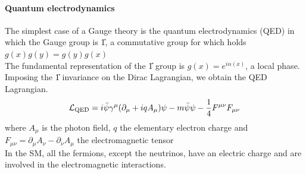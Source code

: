 \paragraph*{Quantum electrodynamics}
The simplest case of a Gauge theory is the quantum electrodynamics (QED) \cite{FeynmanQED:Matter} in which the Gauge group is \U{1}, a commutative group for which holds $g(x)g(y)=g(y)g(x)$\\
The fundamental representation of the \U{1} group is $g(x)=e^{i \alpha(x)}$, \ie a local phase.\\
Imposing the \U{1} invariance on the Dirac Lagrangian, we obtain the QED Lagrangian.
\begin{equation}\label{eq:QED}
    \mathcal{L}_\text{QED}=i\bar{\psi}\gamma^{\mu}(\partial_{\mu}+i q A_{\mu})\psi-m\bar{\psi}\psi-\frac{1}{4}F^{\mu\nu}F_{\mu\nu}
\end{equation}
where $A_\mu$ is the photon field, $q$ the elementary electron charge and $F_{\mu\nu}=\partial_\mu A_\nu-\partial_\nu A_\mu$ the electromagnetic tensor\\
In the SM, all the fermions, except the neutrinos, have an electric charge and are involved in the electromagnetic interactions.\\


